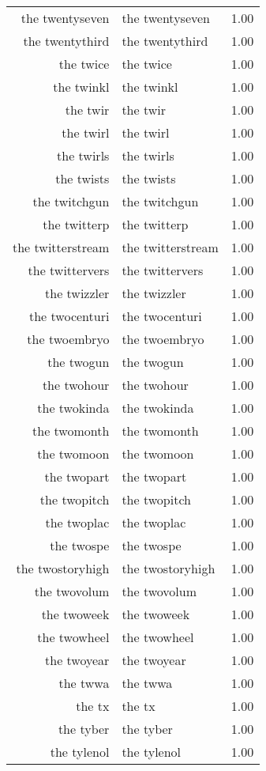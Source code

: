 \begin{table}[ht]
\begin{tabular}{rlr}
  the twentyseven & the twentyseven & 1.00 \\ 
  the twentythird & the twentythird & 1.00 \\ 
  the twice & the twice & 1.00 \\ 
  the twinkl & the twinkl & 1.00 \\ 
  the twir & the twir & 1.00 \\ 
  the twirl & the twirl & 1.00 \\ 
  the twirls & the twirls & 1.00 \\ 
  the twists & the twists & 1.00 \\ 
  the twitchgun & the twitchgun & 1.00 \\ 
  the twitterp & the twitterp & 1.00 \\ 
  the twitterstream & the twitterstream & 1.00 \\ 
  the twittervers & the twittervers & 1.00 \\ 
  the twizzler & the twizzler & 1.00 \\ 
  the twocenturi & the twocenturi & 1.00 \\ 
  the twoembryo & the twoembryo & 1.00 \\ 
  the twogun & the twogun & 1.00 \\ 
  the twohour & the twohour & 1.00 \\ 
  the twokinda & the twokinda & 1.00 \\ 
  the twomonth & the twomonth & 1.00 \\ 
  the twomoon & the twomoon & 1.00 \\ 
  the twopart & the twopart & 1.00 \\ 
  the twopitch & the twopitch & 1.00 \\ 
  the twoplac & the twoplac & 1.00 \\ 
  the twospe & the twospe & 1.00 \\ 
  the twostoryhigh & the twostoryhigh & 1.00 \\ 
  the twovolum & the twovolum & 1.00 \\ 
  the twoweek & the twoweek & 1.00 \\ 
  the twowheel & the twowheel & 1.00 \\ 
  the twoyear & the twoyear & 1.00 \\ 
  the twwa & the twwa & 1.00 \\ 
  the tx & the tx & 1.00 \\ 
  the tyber & the tyber & 1.00 \\ 
  the tylenol & the tylenol & 1.00 \\ 

\end{tabular}
\end{table}
